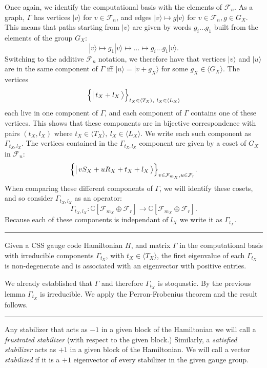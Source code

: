 \documentclass[11pt,oneside]{article}
\def\Complex{\mathbb{C}}
\newcommand{\ket}[1]{|{#1}\rangle}
\newcommand{\bket}[1]{\bigl|\,{#1}\,\bigr\rangle}
\def\Span#1{\langle #1 \rangle}
\newcommand{\Field}{\mathcal{F}}
\def\Fnd{\Field_{n}}
\def\Frd{\Field_{r}}
\newcommand\dolemma[1]{\vskip 5pt \noindent{\bf \underline{Lemma #1.}\ }}
\newcommand\doproof{\vskip 5pt \noindent{\bf \underline{Proof:}\ }}
\newcommand\tombstone{\rule{.36em}{2ex}\vskip 5pt}
\newcounter{numitem}
\newcommand{\numitem}[1]{\refstepcounter{numitem}\thenumitem\label{#1}}
\begin{document}
\doproof
Once again, we identify the computational basis with
the elements of $\Field_n.$
As a graph, $\Gamma$ has vertices 
$\ket{v} $ for $v\in\Field_n$, and edges 
$ \ket{v} \mapsto g \ket{v}$ for  $v\in\Fnd, g\in G_X.$
This means that paths starting from $\ket{v}$ are given by
words $g_i...g_1$ built from the elements of the group $G_X:$
$$
    \ket{v} \mapsto g_1 \ket{v} \mapsto ... \mapsto g_i...g_1 \ket{v}.
$$
Switching to the additive $\Field_n$ notation, we
therefore have that 
vertices $\ket{v}$ and $\ket{u}$ are in the
same component of $\Gamma$ iff $\ket{u} = \ket{v+g_X}$ for some $g_X\in\Span{G_X}.$
The vertices
$$\Bigl\{ \bket{t_X + l_X} \Bigr\}_{t_X\in\Span{T_X},\ l_X\in\Span{L_X}}$$
each live in one component of $\Gamma$,
and each component of $\Gamma$ contains one of these vertices.
This shows that these components are in bijective correspondence with
pairs $(t_X, l_X)$ where $t_X\in\Span{T_X},\ l_X\in\Span{L_X}$.
We write each such component as $\Gamma_{t_X,l_X}$.
The vertices contained in the $\Gamma_{t_X,l_X}$ component
are given by a coset of $G_X$ in $\Fnd:$
$$
    \Bigl\{ \bket{v S_X + u R_X + t_X + l_X} \Bigr\}_{v\in \Field_{m_X}, u\in\Frd}.
$$
When comparing these different components of $\Gamma$, we will
identify these cosets, and so consider $\Gamma_{t_X,l_X}$ as an
operator:
$$
    \Gamma_{t_X,l_X} : \Complex[\Field_{m_X}\oplus\Field_r] \to \Complex[\Field_{m_X}\oplus\Field_r].
$$
Because each of these components is independant of $l_X$ we write it as $\Gamma_{t_X}.$
\tombstone

\dolemma{\numitem{lemma22}}
Given a CSS gauge code Hamiltonian $H$, 
and matrix $\Gamma$ in the computational basis 
with irreducible
components $\Gamma_{t_X}$,
with $t_X\in\Span{T_X}$,
the first eigenvalue 
of each $\Gamma_{t_X}$
is non-degenerate
and is associated with an eigenvector 
with positive entries.

\doproof
We already established that $\Gamma$ and therefore
$\Gamma_{t_X}$ is stoquastic.
By the previous lemma $\Gamma_{t_X}$ is irreducible.
We apply the Perron-Frobenius theorem and the result follows.
\tombstone

Any stabilizer that acts as $-1$ in a given block of
the Hamiltonian we will call a \emph{frustrated stabilizer}
(with respect to the given block.)
Similarly, a \emph{satisfied stabilizer} acts as $+1$ in a given
block of the Hamiltonian.
We will call a
vector \emph{stabilized} if it is a $+1$ eigenvector 
of every stabilizer in the given gauge group.
\end{document}

